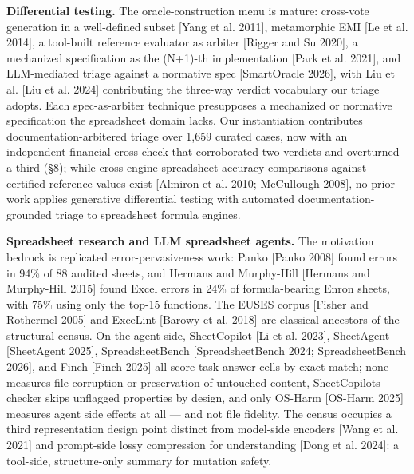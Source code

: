 \documentclass[
]{article}
\newcounter{none} %
\begin{document}
\textbf{Differential testing.} The oracle-construction menu is mature:
cross-vote generation in a well-defined subset {[}Yang et al. 2011{]},
metamorphic EMI {[}Le et al. 2014{]}, a tool-built reference evaluator
as arbiter {[}Rigger and Su 2020{]}, a mechanized specification as the
(N+1)-th implementation {[}Park et al. 2021{]}, and LLM-mediated triage
against a normative spec {[}SmartOracle 2026{]}, with Liu et al. {[}Liu
et al. 2024{]} contributing the three-way verdict vocabulary our triage
adopts. Each spec-as-arbiter technique presupposes a mechanized or
normative specification the spreadsheet domain lacks. Our instantiation
contributes documentation-arbitered triage over 1,659 curated cases, now
with an independent financial cross-check that corroborated two verdicts
and overturned a third (§8); while cross-engine spreadsheet-accuracy
comparisons against certified reference values exist {[}Almiron et al.
2010; McCullough 2008{]}, no prior work applies generative differential
testing with automated documentation-grounded triage to spreadsheet
formula engines.

\textbf{Spreadsheet research and LLM spreadsheet agents.} The motivation
bedrock is replicated error-pervasiveness work: Panko {[}Panko 2008{]}
found errors in 94\% of 88 audited sheets, and Hermans and Murphy-Hill
{[}Hermans and Murphy-Hill 2015{]} found Excel errors in 24\% of
formula-bearing Enron sheets, with 75\% using only the top-15 functions.
The EUSES corpus {[}Fisher and Rothermel 2005{]} and ExceLint {[}Barowy
et al. 2018{]} are classical ancestors of the structural census. On the
agent side, SheetCopilot {[}Li et al. 2023{]}, SheetAgent {[}SheetAgent
2025{]}, SpreadsheetBench {[}SpreadsheetBench 2024; SpreadsheetBench
2026{]}, and Finch {[}Finch 2025{]} all score task-answer cells by exact
match; none measures file corruption or preservation of untouched
content, SheetCopilot\textquotesingle s checker skips unflagged
properties by design, and only OS-Harm {[}OS-Harm 2025{]} measures agent
side effects at all --- and not file fidelity. The census occupies a
third representation design point distinct from model-side encoders
{[}Wang et al. 2021{]} and prompt-side lossy compression for
understanding {[}Dong et al. 2024{]}: a tool-side, structure-only
summary for mutation safety.
\end{document}
